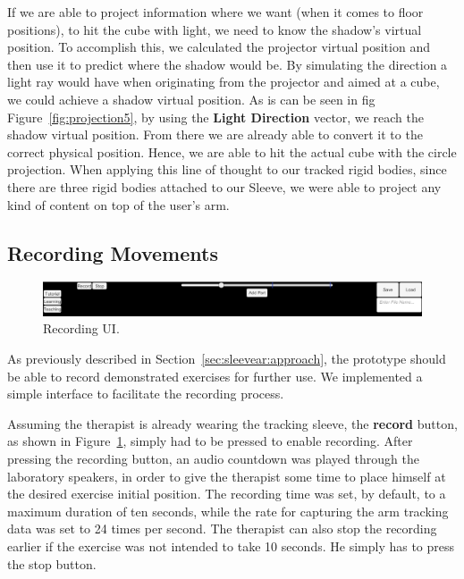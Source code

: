 If we are able to project information where we want (when it comes to floor positions), to hit the cube with light, we need to know the shadow's virtual position. 
To accomplish this, we calculated the projector virtual position and then use it to predict where the shadow would be. 
By simulating the direction a light ray would have when originating from the projector and aimed at a cube, we could achieve a shadow virtual position. 
As is can be seen in fig Figure~\ref{fig:projection5}, by using the \textbf{Light Direction} vector, we reach the shadow virtual position. 
From there we are already able to convert it to the correct physical position. Hence, we are able to hit the actual cube with the circle projection.
When applying this line of thought to our tracked rigid bodies, since there are three rigid bodies attached to our Sleeve, 
we were able to project any kind of content on top of the user's arm.

\subsection{Recording Movements}

\begin{figure}[!b]
    \begin{center}
        \includegraphics[width=\textwidth]{imgs/impl/recordinginterface}
    \end{center}
    \caption{Recording UI.}
    \label{fig:recordinginterface}
\end{figure}

As previously described in Section~\ref{sec:sleevear:approach}, the prototype should be able to record demonstrated exercises for further use.
We implemented a simple interface to facilitate the recording process.

Assuming the therapist is already wearing the tracking sleeve, the \textbf{record} button, as shown in Figure~\ref{fig:recordinginterface}, simply had to be pressed to enable recording. 
After pressing the recording button, an audio countdown was played through the laboratory speakers, in order to give the therapist some time to place himself at the desired exercise initial position. 
The recording time was set, by default, to a maximum duration of ten seconds, while the rate for capturing the arm tracking data was set to 24 times per second.
The therapist can also stop the recording earlier if the exercise was not intended to take 10 seconds. He simply has to press the stop button.

